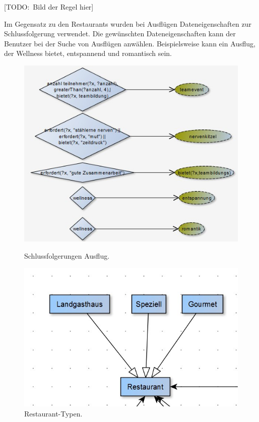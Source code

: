 [TODO:\ Bild der Regel hier]

Im Gegensatz zu den Restaurants wurden bei Ausflügen Dateneigenschaften zur Schlussfolgerung verwendet. Die gewünschten Dateneigenschaften kann der Benutzer bei der Suche von Ausflügen anwählen. Beispielsweise kann ein Ausflug, der Wellness bietet, entspannend und romantisch sein.

\begin{figure}[H]%
    \begin{minipage}[hbt]{0,49\textwidth}
        \centering
        \includegraphics[scale=0.3]{bilder/AufbauAusflug.jpg}
        \caption{Schlussfolgerungen Ausflug.\label{fig:AufbauAusflug}\protect\footnotemark[1]}
    \end{minipage}
    \begin{minipage}[hbt]{0,49\textwidth}
        \centering
        \includegraphics[scale=0.3]{bilder/AufbauRest.jpg}
        \caption{Restaurant-Typen.\label{fig:AufbauRest}\protect\footnotemark[1]}
    \end{minipage}
\end{figure}

